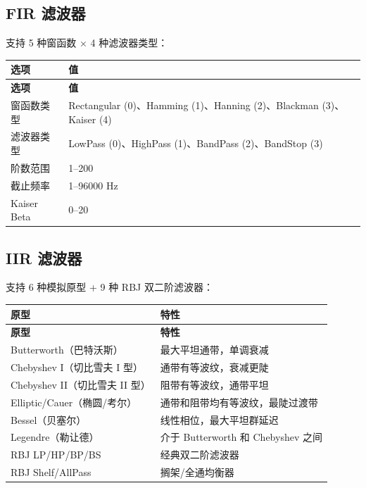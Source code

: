 ﻿\documentclass[12pt,a4paper,oneside]{ctexbook}
\begin{document}
\subsection{FIR 滤波器}

支持 5 种窗函数 × 4 种滤波器类型：

\begin{longtable}{p{3cm}p{10cm}}
    \toprule
    \textbf{选项} & \textbf{值} \\
    \midrule
    \endfirsthead
    \toprule
    \textbf{选项} & \textbf{值} \\
    \midrule
    \endhead
    \bottomrule
    \endfoot
    窗函数类型 & Rectangular (0)、Hamming (1)、Hanning (2)、Blackman (3)、Kaiser (4) \\
    滤波器类型 & LowPass (0)、HighPass (1)、BandPass (2)、BandStop (3) \\
    阶数范围 & 1--200 \\
    截止频率 & 1--96000 Hz \\
    Kaiser Beta & 0--20 \\
    \bottomrule
\end{longtable}

\subsection{IIR 滤波器}

支持 6 种模拟原型 + 9 种 RBJ 双二阶滤波器：

\begin{longtable}{p{4cm}p{9cm}}
    \toprule
    \textbf{原型} & \textbf{特性} \\
    \midrule
    \endfirsthead
    \toprule
    \textbf{原型} & \textbf{特性} \\
    \midrule
    \endhead
    \bottomrule
    \endfoot
    Butterworth（巴特沃斯） & 最大平坦通带，单调衰减 \\
    Chebyshev I（切比雪夫 I 型） & 通带有等波纹，衰减更陡 \\
    Chebyshev II（切比雪夫 II 型） & 阻带有等波纹，通带平坦 \\
    Elliptic/Cauer（椭圆/考尔） & 通带和阻带均有等波纹，最陡过渡带 \\
    Bessel（贝塞尔） & 线性相位，最大平坦群延迟 \\
    Legendre（勒让德） & 介于 Butterworth 和 Chebyshev 之间 \\
    RBJ LP/HP/BP/BS & 经典双二阶滤波器 \\
    RBJ Shelf/AllPass & 搁架/全通均衡器 \\
    \bottomrule
\end{longtable}
\end{document}
